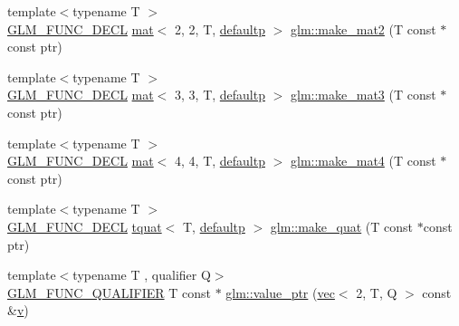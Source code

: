 \begin{DoxyCompactItemize}
\item 
{\footnotesize template$<$typename T $>$ }\\\mbox{\hyperlink{setup_8hpp_ab2d052de21a70539923e9bcbf6e83a51}{G\+L\+M\+\_\+\+F\+U\+N\+C\+\_\+\+D\+E\+CL}} \mbox{\hyperlink{structglm_1_1mat}{mat}}$<$ 2, 2, T, \mbox{\hyperlink{namespaceglm_a36ed105b07c7746804d7fdc7cc90ff25a9d21ccd8b5a009ec7eb7677befc3bf51}{defaultp}} $>$ \mbox{\hyperlink{group__gtc__type__ptr_ga04409e74dc3da251d2501acf5b4b546c}{glm\+::make\+\_\+mat2}} (T const $\ast$const ptr)
\item 
{\footnotesize template$<$typename T $>$ }\\\mbox{\hyperlink{setup_8hpp_ab2d052de21a70539923e9bcbf6e83a51}{G\+L\+M\+\_\+\+F\+U\+N\+C\+\_\+\+D\+E\+CL}} \mbox{\hyperlink{structglm_1_1mat}{mat}}$<$ 3, 3, T, \mbox{\hyperlink{namespaceglm_a36ed105b07c7746804d7fdc7cc90ff25a9d21ccd8b5a009ec7eb7677befc3bf51}{defaultp}} $>$ \mbox{\hyperlink{group__gtc__type__ptr_ga611ee7c4d4cadfc83a8fa8e1d10a170f}{glm\+::make\+\_\+mat3}} (T const $\ast$const ptr)
\item 
{\footnotesize template$<$typename T $>$ }\\\mbox{\hyperlink{setup_8hpp_ab2d052de21a70539923e9bcbf6e83a51}{G\+L\+M\+\_\+\+F\+U\+N\+C\+\_\+\+D\+E\+CL}} \mbox{\hyperlink{structglm_1_1mat}{mat}}$<$ 4, 4, T, \mbox{\hyperlink{namespaceglm_a36ed105b07c7746804d7fdc7cc90ff25a9d21ccd8b5a009ec7eb7677befc3bf51}{defaultp}} $>$ \mbox{\hyperlink{group__gtc__type__ptr_gae7bcedb710d1446c87fd1fc93ed8ee9a}{glm\+::make\+\_\+mat4}} (T const $\ast$const ptr)
\item 
{\footnotesize template$<$typename T $>$ }\\\mbox{\hyperlink{setup_8hpp_ab2d052de21a70539923e9bcbf6e83a51}{G\+L\+M\+\_\+\+F\+U\+N\+C\+\_\+\+D\+E\+CL}} \mbox{\hyperlink{structglm_1_1tquat}{tquat}}$<$ T, \mbox{\hyperlink{namespaceglm_a36ed105b07c7746804d7fdc7cc90ff25a9d21ccd8b5a009ec7eb7677befc3bf51}{defaultp}} $>$ \mbox{\hyperlink{group__gtc__type__ptr_gaadafb6600af2633e4c98cc64c72f5269}{glm\+::make\+\_\+quat}} (T const $\ast$const ptr)
\item 
{\footnotesize template$<$typename T , qualifier Q$>$ }\\\mbox{\hyperlink{setup_8hpp_a33fdea6f91c5f834105f7415e2a64407}{G\+L\+M\+\_\+\+F\+U\+N\+C\+\_\+\+Q\+U\+A\+L\+I\+F\+I\+ER}} T const  $\ast$ \mbox{\hyperlink{group__gtc__type__ptr_gaa39964028a0cfbcd18549e33feea7357}{glm\+::value\+\_\+ptr}} (\mbox{\hyperlink{structglm_1_1vec}{vec}}$<$ 2, T, Q $>$ const \&\mbox{\hyperlink{_s_d_l__opengl_8h_a10a82eabcb59d2fcd74acee063775f90}{v}})

\end{DoxyCompactItemize}
